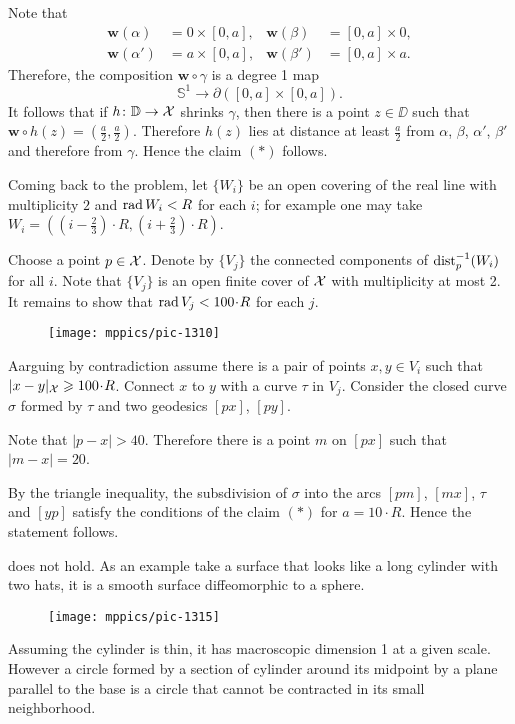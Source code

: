Note that 
\begin{align*}
\bm{w}(\alpha)&=0\times [0,a],
&
\bm{w}(\beta)&=[0,a]\times 0,
\\
\bm{w}(\alpha')&=a\times [0,a],
&
\bm{w}(\beta')&=[0,a]\times a.
\end{align*} 
Therefore, the composition $\bm{w}\circ\gamma$ is a degree 1 map 
\[\mathbb{S}^1\to \partial([0,a]\times[0,a]).\] 
It follows that if $h\colon\mathbb{D}\to \mathcal{X}$ shrinks $\gamma$, then there is a point $z\in\DD$ such that 
$\bm{w}\circ h(z)=(\tfrac a2,\tfrac a2)$.
Therefore $h(z)$ lies at distance at least $\tfrac a2$ from $\alpha$, $\beta$, $\alpha'$, $\beta'$
and therefore from $\gamma$.
Hence the claim $({*})$ follows.

\medskip

Coming back to the problem, let $\{W_i\}$ be an open covering of the real line with multiplicity $2$ and $\mathop{\rm rad}\nolimits W_i<R$ for each $i$;
for example one may take $W_i=((i-\tfrac23)\cdot R,(i+\tfrac23)\cdot R)$.

Choose a point $p\in \mathcal{X}$.
Denote by $\{V_j\}$ the connected components of $\mathrm{dist}_p^{-1}(W_i)$ for all $i$.
Note that $\{V_j\}$ is an open finite cover of $\mathcal{X}$ with multiplicity at most 2.
It remains to show that $\rad V_j<100\cdot R$ for each $j$.

\begin{wrapfigure}{o}{31 mm}
\vskip-2mm
\centering
\texttt{[image: mppics/pic-1310]}
\end{wrapfigure}

Aarguing by contradiction assume there is a pair of points  $x,y\in V_i$ 
such that $|x\z-y|_{\spc{X}}\ge 100\cdot R$.
Connect $x$ to $y$ with a curve $\tau$ in $V_j$.
Consider the closed curve $\sigma$ formed by $\tau$ and two geodesics $[px]$, $[py]$.


Note that $|p-x|>40$.
Therefore there is a point $m$ on $[px]$ such that $|m-x|=20$.

By the triangle inequality, the subsdivision of $\sigma$ into the arcs $[pm]$, $[mx]$, $\tau$ and $[yp]$ satisfy the conditions of the claim $({*})$ for $a=10\cdot R$.
Hence the statement follows.

 does not hold.
As an example take a surface that looks like a long cylinder with two hats,
it is a smooth surface diffeomorphic to a sphere.
\begin{figure}[h!]
\vskip0mm
\centering
\texttt{[image: mppics/pic-1315]}
\end{figure}
Assuming the cylinder is thin, it has macroscopic dimension 1 at a given scale.
However a circle formed by a section of cylinder around its midpoint by a plane parallel to the base is a circle that cannot be contracted in its small neighborhood.

